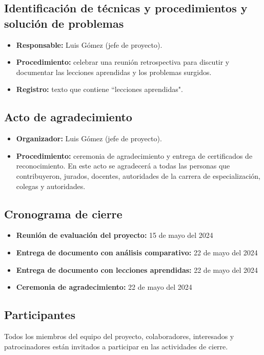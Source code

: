 \subsection{Identificación de técnicas y procedimientos y solución de problemas}
\begin{itemize}
	\item \textbf{Responsable:} Luis Gómez (jefe de proyecto).
	\item \textbf{Procedimiento:} celebrar una reunión retrospectiva para discutir y documentar las lecciones aprendidas y los problemas surgidos.
	\item \textbf{Registro:} texto que contiene ``lecciones aprendidas".
\end{itemize}

\subsection{Acto de agradecimiento}
\begin{itemize}
	\item \textbf{Organizador:} Luis Gómez (jefe de proyecto).
	\item \textbf{Procedimiento:} ceremonia de agradecimiento y entrega de certificados de reconocimiento. En este acto se agradecerá a todas las personas
	que contribuyeron, jurados, docentes, autoridades de la carrera de especialización,
	colegas y autoridades.
\end{itemize}

\subsection{Cronograma de cierre}
\begin{itemize}
	\item \textbf{Reunión de evaluación del proyecto:} 15 de mayo del 2024
	\item \textbf{Entrega de documento con análisis comparativo:} 22 de mayo del 2024
	\item \textbf{Entrega de documento con lecciones aprendidas:} 22 de mayo del 2024
	\item \textbf{Ceremonia de agradecimiento:} 22 de mayo del 2024
\end{itemize}

\subsection*{Participantes}
Todos los miembros del equipo del proyecto, colaboradores, interesados y patrocinadores están invitados a participar en las actividades de cierre.
